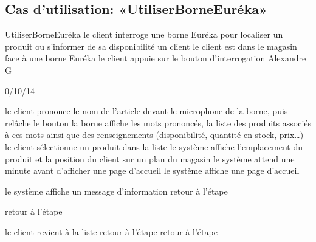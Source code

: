 \subsection{Cas d'utilisation: «UtiliserBorneEuréka» }

\startCU
\nom UtiliserBorneEuréka
\but le client interroge une borne Euréka pour localiser un produit ou s’informer de sa disponibilité
\acteur un client
\precondition le client est dans le magasin face à une borne Euréka
\declenchement le client appuie sur le bouton d'interrogation
\auteur Alexandre G
\date 30/10/14

\nominal %
\startnominal
\etape[DEBUT] le client prononce le nom de l'article devant le microphone de la borne, puis relâche le bouton
\etape[INCONNU] la borne affiche les mots prononcés, la liste des produits associés à ces mots ainsi que des renseignements (disponibilité, quantité en stock, prix\dots) 
\etape[LISTEVIDE] le client sélectionne un produit dans la liste
\etape le système affiche l'emplacement du produit et la position du client sur un plan du magasin
\etape[AUTRE] le système attend une minute avant d'afficher une page d'accueil
\stopnominal
\postcondition le système affiche une page d'accueil

\alternatifs 

\startalternatif[INCONNU]
  \etape le système affiche un message d'information
  \etape retour à l'étape \in[AUTRE]
\stopcondition
\stopalternatif

\startalternatif[LISTEVIDE]
\etape retour à l'étape \in[AUTRE]
\stopcondition
\stopalternatif

\startalternatif[AUTRE] 
  \etape le client revient à la liste 
  \etape retour à l'étape \in[LISTEVIDE]
\stopcondition
{}
  \etape retour à l'étape \in[DEBUT]
\stopcondition
\stopalternatif

\stopCU
